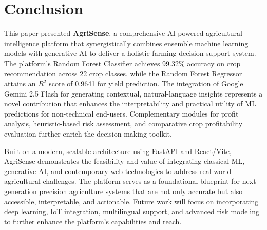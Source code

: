 
\section{Conclusion}
\label{sec:conclusion}

This paper presented \textbf{AgriSense}, a comprehensive AI-powered agricultural intelligence platform that synergistically combines ensemble machine learning models with generative AI to deliver a holistic farming decision support system. The platform's Random Forest Classifier achieves 99.32\% accuracy on crop recommendation across 22 crop classes, while the Random Forest Regressor attains an $R^2$ score of 0.9641 for yield prediction. The integration of Google Gemini 2.5 Flash for generating contextual, natural-language insights represents a novel contribution that enhances the interpretability and practical utility of ML predictions for non-technical end-users. Complementary modules for profit analysis, heuristic-based risk assessment, and comparative crop profitability evaluation further enrich the decision-making toolkit.

Built on a modern, scalable architecture using FastAPI and React/Vite, AgriSense demonstrates the feasibility and value of integrating classical ML, generative AI, and contemporary web technologies to address real-world agricultural challenges. The platform serves as a foundational blueprint for next-generation precision agriculture systems that are not only accurate but also accessible, interpretable, and actionable. Future work will focus on incorporating deep learning, IoT integration, multilingual support, and advanced risk modeling to further enhance the platform's capabilities and reach.
